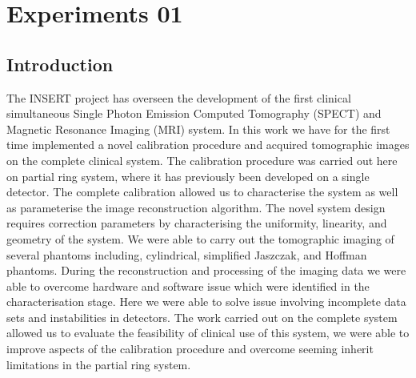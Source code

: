\chapter{Experiments 01}
\label{chapterlabel}

\blindtext

\section{Introduction}
The INSERT project has overseen the development
of the first clinical simultaneous Single Photon Emission Computed
Tomography (SPECT) and Magnetic Resonance Imaging
(MRI) system. In this work we have for the first time implemented
a novel calibration procedure and acquired tomographic images
on the complete clinical system. The calibration procedure was
carried out here on partial ring system, where it has previously
been developed on a single detector. The complete calibration
allowed us to characterise the system as well as parameterise
the image reconstruction algorithm. The novel system design
requires correction parameters by characterising the uniformity,
linearity, and geometry of the system. We were able to carry
out the tomographic imaging of several phantoms including,
cylindrical, simplified Jaszczak, and Hoffman phantoms. During
the reconstruction and processing of the imaging data we were
able to overcome hardware and software issue which were
identified in the characterisation stage. Here we were able to
solve issue involving incomplete data sets and instabilities in
detectors. The work carried out on the complete system allowed
us to evaluate the feasibility of clinical use of this system, we
were able to improve aspects of the calibration procedure and
overcome seeming inherit limitations in the partial ring system.

